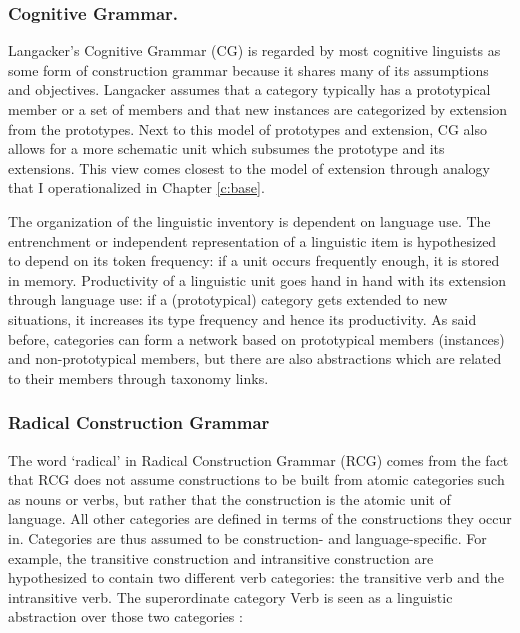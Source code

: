 \subsubsection{Cognitive Grammar.}
Langacker's Cognitive Grammar (CG) is regarded by most cognitive linguists as some form of construction grammar because it shares many of its assumptions and objectives. Langacker assumes that a category typically has a prototypical member or a set of members and that new instances are categorized by extension from the prototypes. Next to this model of prototypes and extension, CG also allows for a more schematic unit which subsumes the prototype and its extensions. This view comes closest to the model of extension through analogy that I operationalized in Chapter \ref{c:base}.

The organization of the linguistic inventory is dependent on language use. The entrenchment or independent representation of a linguistic item is hypothesized to depend on its token frequency: if a unit occurs frequently enough, it is stored in memory. Productivity of a linguistic unit goes hand in hand with its extension through language use: if a (prototypical) category gets extended to new situations, it increases its type frequency and hence its productivity. As said before, categories can form a network based on prototypical members (instances) and non-prototypical members, but there are also abstractions which are related to their members through taxonomy links.


\subsubsection{Radical Construction Grammar}
The word `radical' in Radical Construction Grammar (RCG) comes from the fact that RCG does not assume constructions to be built from atomic categories such as nouns or verbs, but rather that the construction is the atomic unit of language. All other categories are defined in terms of the constructions they occur in. Categories are thus assumed to be construction- and language-specific. For example, the transitive construction and intransitive construction are hypothesized to contain two different verb categories: the transitive verb and the intransitive verb. The superordinate category Verb is seen as a linguistic abstraction over those two categories \citep[p. 287--288]{croft04cognitive}:

